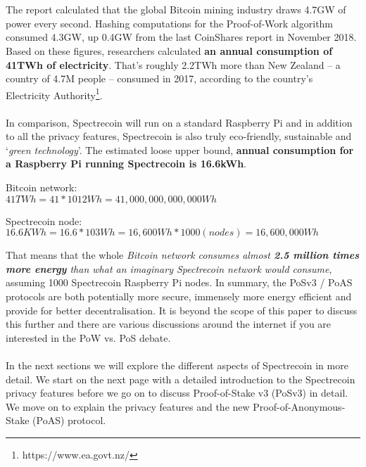 \\
\\
\noindent
The report calculated that the global Bitcoin mining industry draws 4.7GW of power every second. Hashing computations for the Proof-of-Work algorithm consumed 4.3GW, up 0.4GW from the last CoinShares report in November 2018. Based on these figures, researchers calculated \textbf{an annual consumption of 41TWh of electricity}. That’s roughly 2.2TWh more than New Zealand – a country of 4.7M people – consumed in 2017, according to the country’s Electricity Authority\footnote{https://www.ea.govt.nz/}.
\\
\\
\noindent
In comparison, Spectrecoin will run on a standard Raspberry Pi and in addition to all the privacy features, Spectrecoin is also truly eco-friendly, sustainable and ‘\textit{green technology}’. The estimated loose upper bound, \textbf{annual 
consumption for a Raspberry Pi running Spectrecoin is 16.6kWh}.

\vspace{3mm} %

Bitcoin network:\\
$41 TWh = 41*1012 Wh = 41,000,000,000,000 Wh$

\vspace{3mm} %

Spectrecoin node:\\
$16.6 KWh = 16.6 * 103 Wh = 16,600 Wh * 1000 (nodes) = 16,600,000 Wh$

\vspace{3mm} %

\noindent
That means that the whole \textit{Bitcoin network consumes almost \textbf{2.5 million times
more energy} than what an imaginary Spectrecoin network would consume}, assuming
1000 Spectrecoin Raspberry Pi nodes.
\newpage
\noindent
In summary, the PoSv3 / PoAS protocols are both potentially more secure,
immensely more energy efficient and provide for better decentralisation.
It is beyond the scope of this paper to discuss this further and there are
various discussions around the internet if you are interested in the PoW vs.
PoS debate.
\\
\\
\noindent
In the next sections we will explore the different aspects of Spectrecoin in
more detail. We start on the next page with a detailed introduction to the
Spectrecoin privacy features before we go on to discuss Proof-of-Stake v3
(PoSv3) in detail. We move on to explain the privacy features and the new
Proof-of-Anonymous-Stake (PoAS) protocol.